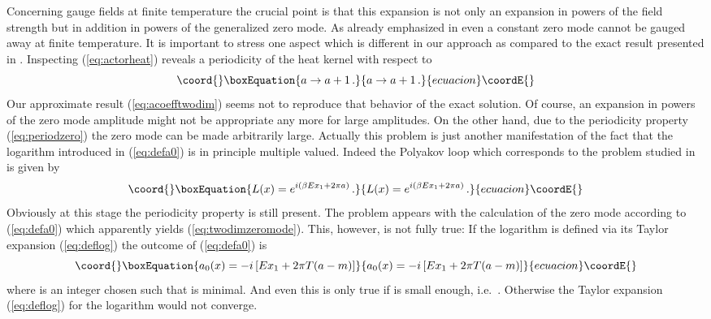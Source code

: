 \documentclass[a4paper,showpacs,showkeys,prd,nofootinbib]{revtex4}
\begin{document}
Concerning gauge fields at finite temperature the crucial point is that this expansion 
is not only an 
expansion in powers of the field strength but in addition in powers of the generalized
zero mode. As already emphasized in \cite{Actor:1998cn} even a constant zero mode cannot
be gauged away at finite temperature. It is important to stress one aspect which is
different in our approach as compared to the exact result presented in \cite{Actor:1998cn}.
Inspecting (\ref{eq:actorheat}) reveals a periodicity of the heat kernel with respect
to 
\begin{equation}\coord{}\boxEquation{
  \label{eq:periodzero}
a \to a + 1   \,.
}{
  a \to a + 1   \,.
}{ecuacion}\coordE{}\end{equation}
Our approximate result (\ref{eq:acoefftwodim}) seems not to reproduce that behavior of 
the exact solution. Of course, an expansion in powers of the zero mode amplitude might
not be appropriate any more for large amplitudes. On the other hand, due to the 
periodicity property (\ref{eq:periodzero}) the zero mode can be made arbitrarily large.
Actually this problem is just another manifestation of the fact that the logarithm 
introduced in (\ref{eq:defa0}) is in principle multiple valued. Indeed the Polyakov 
loop which corresponds to the problem studied in \cite{Actor:1998cn} is given by
\begin{equation}\coord{}\boxEquation{
  \label{eq:polyactor}
L(x) = e^{i(\beta E x_1 + 2 \pi a)}   \,.
}{
  L(x) = e^{i(\beta E x_1 + 2 \pi a)}   \,.
}{ecuacion}\coordE{}\end{equation}
Obviously at this stage the periodicity property is still present. The problem appears
with the calculation of the zero mode according to (\ref{eq:defa0}) which apparently
yields (\ref{eq:twodimzeromode}). This, however, is not fully true: If the logarithm
is defined via its Taylor expansion (\ref{eq:deflog}) the outcome of (\ref{eq:defa0}) 
is 
\begin{equation}\coord{}\boxEquation{
  \label{eq:truea0}
a_0(x) = -i \, [E x_1 + 2 \pi T (a-m)] 
}{
  a_0(x) = -i \, [E x_1 + 2 \pi T (a-m)] 
}{ecuacion}\coordE{}\end{equation}
where \coordHE{} is an integer chosen such that \coordHE{}
is minimal. And even this is only true if \myHighlight{$\phi$}\coordHE{} is small enough, 
i.e.~\coordHE{}. 
Otherwise the Taylor expansion (\ref{eq:deflog}) for the logarithm would not converge.
\end{document}
